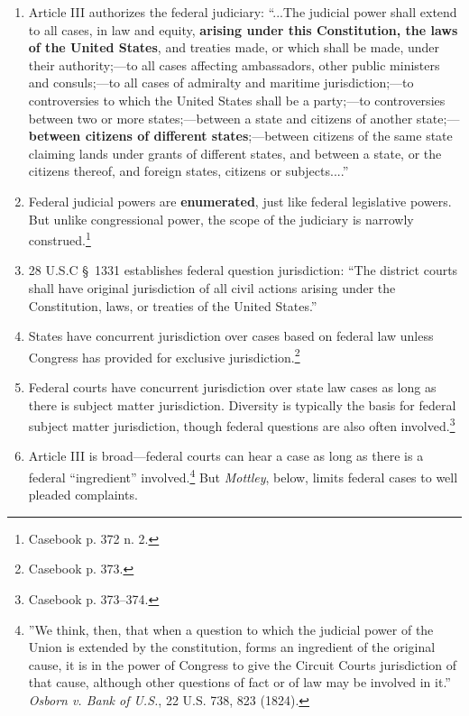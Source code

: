 \begin{enumerate}
    \item Article III authorizes the federal judiciary: ``...The judicial 
    power shall extend to all cases, in law and equity, \textbf{arising under 
    this Constitution, the laws of the United States}, and treaties made, or 
    which shall be made, under their authority;---to all cases affecting 
    ambassadors, other public ministers and consuls;---to all cases of 
    admiralty and maritime jurisdiction;---to controversies to which the 
    United States shall be a party;---to controversies between two or more 
    states;---between a state and citizens of another state;---\textbf{between 
    citizens of different states};---between citizens of the same state 
    claiming lands under grants of different states, and between a state, or 
    the citizens thereof, and foreign states, citizens or subjects....''
    \item Federal judicial powers are \textbf{enumerated}, just like federal 
    legislative powers. But unlike congressional power, the scope of the 
    judiciary is narrowly construed.\footnote{Casebook p. 372 n.  2.}
    \item 28 U.S.C \S\ 1331 establishes federal question jurisdiction: ``The 
    district courts shall have original jurisdiction of all civil actions 
    arising under the Constitution, laws, or treaties of the United States.''
    \item States have concurrent jurisdiction over cases based on federal law 
    unless Congress has provided for exclusive jurisdiction.\footnote{Casebook 
    p. 373.}
    \item Federal courts have concurrent jurisdiction over state law cases as 
    long as there is subject matter jurisdiction. Diversity is typically the 
    basis for federal subject matter jurisdiction, though federal questions 
    are also often involved.\footnote{Casebook p. 373--374.}
    \item Article III is broad---federal courts can hear a case as long as there is a federal 
    ``ingredient'' involved.\footnote{''We think, then, that when a question to 
    which the judicial power of the Union is extended by the constitution, 
    forms an ingredient of the original cause, it is in the power of Congress 
    to give the Circuit Courts jurisdiction of that cause, although other 
    questions of fact or of law may be involved in it.'' \emph{Osborn v. Bank 
    of U.S.}, 22 U.S. 738, 823 (1824).} But \emph{Mottley}, below, limits 
    federal cases to well pleaded complaints.
\end{enumerate}


